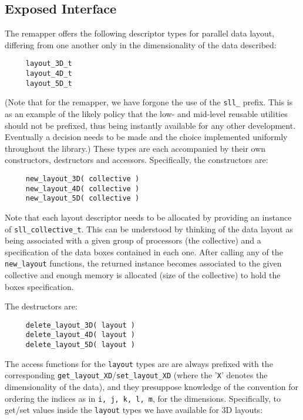 \documentclass[]{report}   %
\begin{document}
\subsection{Exposed Interface}
The remapper offers the following descriptor types for parallel data layout, differing from one another only in the dimensionality of the data described:

\begin{verbatim}
     layout_3D_t
     layout_4D_t
     layout_5D_t
\end{verbatim}

(Note that for the remapper, we have forgone the use of the \verb+sll_+ prefix. This is as an example of the likely policy that the low- and mid-level reusable utilities should not be prefixed, thus being instantly available for any other development. Eventually a decision needs to be made and the choice implemented uniformly throughout the library.) These types are each accompanied by their own constructors, destructors and accessors. Specifically, the constructors are:

\begin{verbatim}
     new_layout_3D( collective )
     new_layout_4D( collective )
     new_layout_5D( collective )
\end{verbatim}

Note that each layout descriptor needs to be allocated by providing an instance of \verb+sll_collective_t+. This can be understood by thinking of the data layout as being associated with a given group of processors (the collective) and a specification of the data boxes contained in each one. After calling any of the \verb+new_layout+ functions, the returned instance becomes associated to the given collective and enough memory is allocated (size of the collective) to hold the boxes specification.

The destructors are:
\begin{verbatim}
     delete_layout_3D( layout )
     delete_layout_4D( layout )
     delete_layout_5D( layout )
\end{verbatim}

The access functions for the \verb+layout+ types are are always prefixed with the corresponding \verb+get_layout_XD+/\verb+set_layout_XD+ (where the '\verb+X+' denotes the dimensionality of the data), and they presuppose knowledge of the convention for ordering the indices as in \verb+i, j, k, l, m+, for the dimensions. Specifically, to get/set values inside the \verb+layout+ types we have available for 3D layouts:
\end{document}

